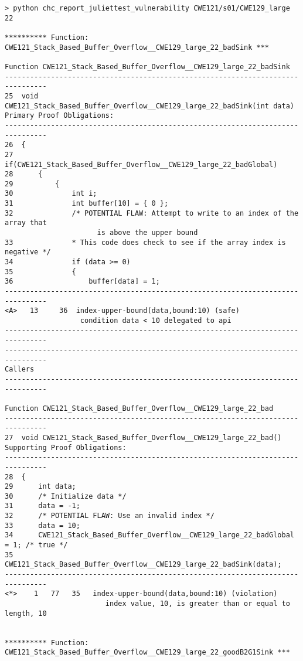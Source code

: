 \documentclass[11pt]{article}
\begin{document}
\begin{scriptsize}
\begin{verbatim}
> python chc_report_juliettest_vulnerability CWE121/s01/CWE129_large 22

********** Function: CWE121_Stack_Based_Buffer_Overflow__CWE129_large_22_badSink ***

Function CWE121_Stack_Based_Buffer_Overflow__CWE129_large_22_badSink
--------------------------------------------------------------------------------
25  void CWE121_Stack_Based_Buffer_Overflow__CWE129_large_22_badSink(int data)
Primary Proof Obligations:
--------------------------------------------------------------------------------
26  {
27      if(CWE121_Stack_Based_Buffer_Overflow__CWE129_large_22_badGlobal)
28      {
29          {
30              int i;
31              int buffer[10] = { 0 };
32              /* POTENTIAL FLAW: Attempt to write to an index of the array that 
                      is above the upper bound
33              * This code does check to see if the array index is negative */
34              if (data >= 0)
35              {
36                  buffer[data] = 1;
--------------------------------------------------------------------------------
<A>   13     36  index-upper-bound(data,bound:10) (safe)
                  condition data < 10 delegated to api
--------------------------------------------------------------------------------
--------------------------------------------------------------------------------
Callers
--------------------------------------------------------------------------------

Function CWE121_Stack_Based_Buffer_Overflow__CWE129_large_22_bad
--------------------------------------------------------------------------------
27  void CWE121_Stack_Based_Buffer_Overflow__CWE129_large_22_bad()
Supporting Proof Obligations:
--------------------------------------------------------------------------------
28  {
29      int data;
30      /* Initialize data */
31      data = -1;
32      /* POTENTIAL FLAW: Use an invalid index */
33      data = 10;
34      CWE121_Stack_Based_Buffer_Overflow__CWE129_large_22_badGlobal = 1; /* true */
35      CWE121_Stack_Based_Buffer_Overflow__CWE129_large_22_badSink(data);
--------------------------------------------------------------------------------
<*>    1   77   35   index-upper-bound(data,bound:10) (violation)
                        index value, 10, is greater than or equal to length, 10


********** Function: CWE121_Stack_Based_Buffer_Overflow__CWE129_large_22_goodB2G1Sink ***


\end{verbatim}
\end{scriptsize}
\end{document}
